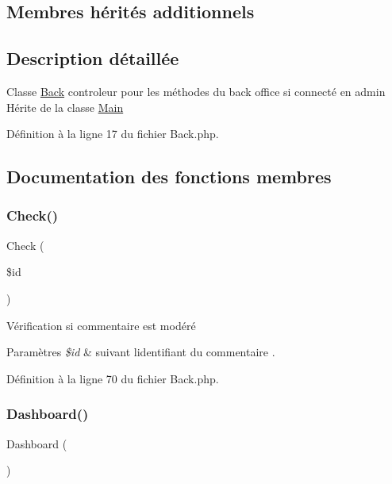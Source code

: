 \subsection*{Membres hérités additionnels}


\subsection{Description détaillée}
Classe \hyperlink{class_src_1_1_controllers_1_1_back}{Back} controleur pour les méthodes du back office si connecté en admin Hérite de la classe \hyperlink{class_src_1_1_controllers_1_1_main}{Main} 

Définition à la ligne 17 du fichier Back.\+php.



\subsection{Documentation des fonctions membres}
\mbox{\label{class_src_1_1_controllers_1_1_back_a384a1ec9e22b88a73de48023bb2bbf4f}} 
\subsubsection{\texorpdfstring{Check()}{Check()}}
{\footnotesize\ttfamily Check (\begin{DoxyParamCaption}\item[{}]{\$id }\end{DoxyParamCaption})}

Vérification si commentaire est modéré 
\begin{DoxyParams}{Paramètres}
{\em \$id} & suivant l\textquotesingle{}identifiant du commentaire . \\
\hline
\end{DoxyParams}


Définition à la ligne 70 du fichier Back.\+php.

\mbox{\label{class_src_1_1_controllers_1_1_back_a405a66825259e2e811a2011a61c2beff}} 
\subsubsection{\texorpdfstring{Dashboard()}{Dashboard()}}
{\footnotesize\ttfamily Dashboard (\begin{DoxyParamCaption}{ }\end{DoxyParamCaption})}

